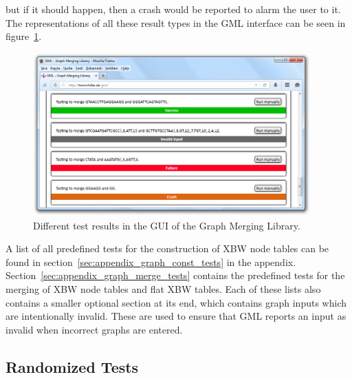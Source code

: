 \documentclass[a4paper,12pt,twoside,BCOR=10mm]{scrbook}
\begin{document}
but if it should happen, then a crash would be reported to alarm the user to it. \\
The representations of all these result types in the GML interface can be seen in figure~\ref{fig:evo_gml_different_test_results}. 
\begin{figure}[!htb]
\centering
\includegraphics[width=0.95\textwidth]{evo_gml_different_test_results.png}
\caption[GML Test Results]{Different test results in the GUI of the Graph Merging Library.} \label{fig:evo_gml_different_test_results}
\end{figure}
A list of all predefined tests for the construction of XBW node tables can be found 
in section~\ref{sec:appendix_graph_const_tests} in the appendix. 
Section~\ref{sec:appendix_graph_merge_tests} contains the predefined tests for 
the merging of XBW node tables and flat XBW tables. 
Each of these lists also contains a smaller optional section at its end, 
which contains graph inputs which are intentionally invalid. These are used 
to ensure that GML reports an input as invalid when incorrect graphs are entered. 

\subsection{Randomized Tests}
\end{document}
